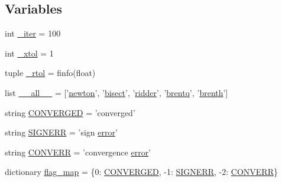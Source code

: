\subsection*{Variables}
\begin{DoxyCompactItemize}
\item 
int \hyperlink{namespacescipy_1_1optimize_1_1zeros_aaeb208fcd759004ff55061e4ece6af34}{\+\_\+iter} = 100
\item 
int \hyperlink{namespacescipy_1_1optimize_1_1zeros_af117e07d5a2cbf80b5dd0a02ff847f77}{\+\_\+xtol} = 1
\item 
tuple \hyperlink{namespacescipy_1_1optimize_1_1zeros_a8195c6fae6fc47dcfd8b6a1de741372b}{\+\_\+rtol} = finfo(float)
\item 
list \hyperlink{namespacescipy_1_1optimize_1_1zeros_a20bb9fd4594454a268fa8b93df50f0d6}{\+\_\+\+\_\+all\+\_\+\+\_\+} = \mbox{[}'\hyperlink{namespacescipy_1_1optimize_1_1zeros_a68360f1b4d04cd5b9b379ad9c9f83d8b}{newton}', '\hyperlink{namespacescipy_1_1optimize_1_1zeros_a83315ba9f5f00391cade4e5d4a5e3a0c}{bisect}', '\hyperlink{namespacescipy_1_1optimize_1_1zeros_a9c9f8fc893c60c2dd83d4f104525a076}{ridder}', '\hyperlink{namespacescipy_1_1optimize_1_1zeros_ad80f0ae5fa1147fe0c77cd6159380b59}{brentq}', '\hyperlink{namespacescipy_1_1optimize_1_1zeros_a46554b03f9304e126d5f4330727cd131}{brenth}'\mbox{]}
\item 
string \hyperlink{namespacescipy_1_1optimize_1_1zeros_ae94fd9b4c3e606a658916b313bbb9c97}{C\+O\+N\+V\+E\+R\+G\+E\+D} = 'converged'
\item 
string \hyperlink{namespacescipy_1_1optimize_1_1zeros_aeebed2989815ce89b4efba74926c6d56}{S\+I\+G\+N\+E\+R\+R} = 'sign \hyperlink{specfun_8f_a1606d291e8b683668654c8d4219efa20}{error}'
\item 
string \hyperlink{namespacescipy_1_1optimize_1_1zeros_aa4044a77254dd216fb958ece2ae9ded7}{C\+O\+N\+V\+E\+R\+R} = 'convergence \hyperlink{specfun_8f_a1606d291e8b683668654c8d4219efa20}{error}'
\item 
dictionary \hyperlink{namespacescipy_1_1optimize_1_1zeros_a7e9cc0583205f6b55a4d523a6a3a02d2}{flag\+\_\+map} = \{0\+: \hyperlink{namespacescipy_1_1optimize_1_1zeros_ae94fd9b4c3e606a658916b313bbb9c97}{C\+O\+N\+V\+E\+R\+G\+E\+D}, -\/1\+: \hyperlink{namespacescipy_1_1optimize_1_1zeros_aeebed2989815ce89b4efba74926c6d56}{S\+I\+G\+N\+E\+R\+R}, -\/2\+: \hyperlink{namespacescipy_1_1optimize_1_1zeros_aa4044a77254dd216fb958ece2ae9ded7}{C\+O\+N\+V\+E\+R\+R}\}
\end{DoxyCompactItemize}


